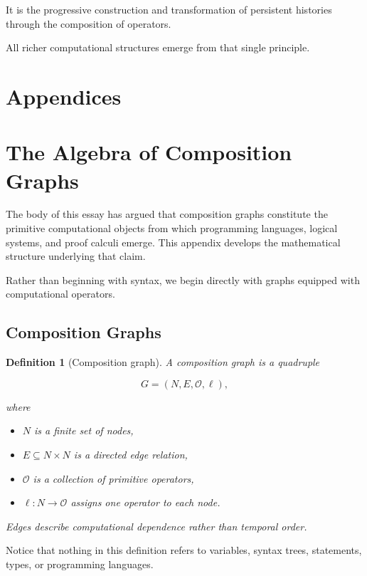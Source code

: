 \documentclass[12pt,oneside]{article}
\newtheorem{definition}{Definition}[section]
\begin{document}
It is the progressive construction and transformation of persistent histories through the composition of operators.

All richer computational structures emerge from that single principle.

\newpage 
\section*{Appendices}

\appendix

\section{The Algebra of Composition Graphs}

The body of this essay has argued that composition graphs constitute the primitive computational objects from which programming languages, logical systems, and proof calculi emerge. This appendix develops the mathematical structure underlying that claim.

Rather than beginning with syntax, we begin directly with graphs equipped with computational operators.

\subsection{Composition Graphs}

\begin{definition}[Composition graph]
A composition graph is a quadruple

\[
G=(N,E,\mathcal O,\ell),
\]

where

\begin{itemize}
\item $N$ is a finite set of nodes,
\item $E\subseteq N\times N$ is a directed edge relation,
\item $\mathcal O$ is a collection of primitive operators,
\item $\ell:N\rightarrow\mathcal O$
assigns one operator to each node.
\end{itemize}

Edges describe computational dependence rather than temporal order.
\end{definition}

Notice that nothing in this definition refers to variables, syntax trees, statements, types, or programming languages.
\end{document}
